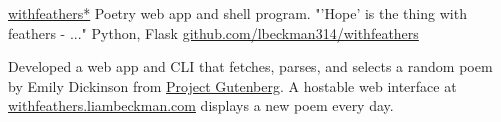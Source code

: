 \showoff
{\textcolor{my-blue}{\href{https://withfeathers.liambeckman.com}{withfeathers*}}}
{Poetry web app and shell program. "'Hope' is the thing with feathers - ..."}
{Python, Flask}
{\textcolor{my-blue}{\href{https://github.com/lbeckman314/withfeathers}{github.com/lbeckman314/withfeathers}}}

Developed a web app and CLI that fetches, parses, and selects a random poem by Emily Dickinson from \textcolor{my-blue}{\href{https://www.gutenberg.org/ebooks/12242}{Project Gutenberg}}. A hostable web interface at \textcolor{my-blue}{\href{https://withfeathers.liambeckman.com}{withfeathers.liambeckman.com}} displays a new poem every day.

